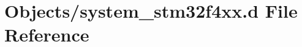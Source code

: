 \hypertarget{system__stm32f4xx_8d}{}\section{Objects/system\+\_\+stm32f4xx.d File Reference}
\label{system__stm32f4xx_8d}

